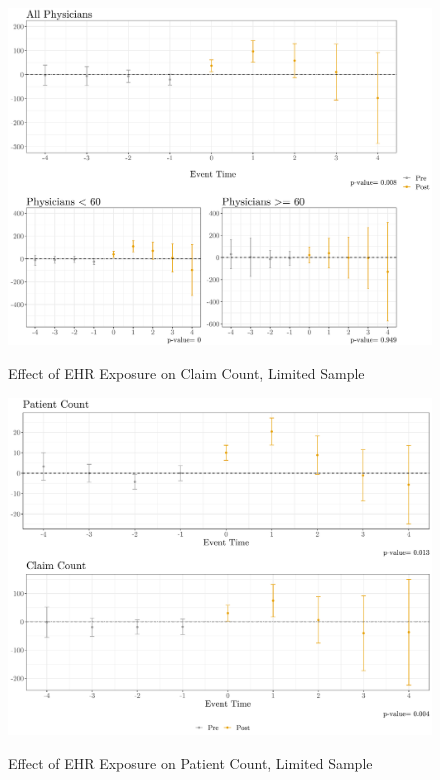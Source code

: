\documentclass[11pt]{article}
\begin{document}
\begin{figure}[p]
    \centering
    \caption{Effect of EHR Exposure on Claim Count, Limited Sample}
    \includegraphics[scale=.4]{Objects/claim_plot.pdf}
    \label{fig:claim}
\end{figure}

\begin{figure}[p]
    \centering
    \caption{Effect of EHR Exposure on Patient Count, Limited Sample}
    \includegraphics[scale=.4]{Objects/limitedsample_plot.pdf}
    \label{fig:limitedsample}
\end{figure}
\end{document}
